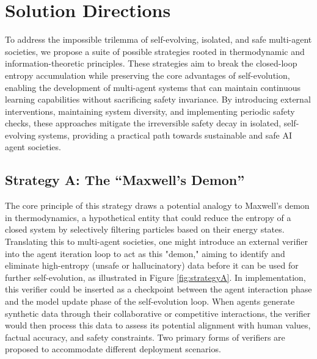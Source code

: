 \documentclass{article}
\theoremstyle{definition}
\theoremstyle{plain}
\begin{document}
\section{Solution Directions}

To address the impossible trilemma of self-evolving, isolated, and safe multi-agent societies, we propose a suite of possible strategies rooted in thermodynamic and information-theoretic principles. These strategies aim to break the closed-loop entropy accumulation while preserving the core advantages of self-evolution, enabling the development of multi-agent systems that can maintain continuous learning capabilities without sacrificing safety invariance. 
By introducing external interventions, maintaining system diversity, and implementing periodic safety checks, these approaches mitigate the irreversible safety decay in isolated, self-evolving systems, providing a practical path towards sustainable and safe AI agent societies.

\subsection{Strategy A: The ``Maxwell's Demon''}

The core principle of this strategy draws a potential analogy to Maxwell's demon in thermodynamics, a hypothetical entity that could reduce the entropy of a closed system by selectively filtering particles based on their energy states. Translating this to multi-agent societies, one might introduce an external verifier into the agent iteration loop to act as this "demon," aiming to identify and eliminate high-entropy (unsafe or hallucinatory) data before it can be used for further self-evolution, as illustrated in Figure \ref{fig:strategyA}.
In implementation, this verifier could be inserted as a checkpoint between the agent interaction phase and the model update phase of the self-evolution loop. When agents generate synthetic data through their collaborative or competitive interactions, the verifier would then process this data to assess its potential alignment with human values, factual accuracy, and safety constraints. Two primary forms of verifiers are proposed to accommodate different deployment scenarios.
\end{document}

